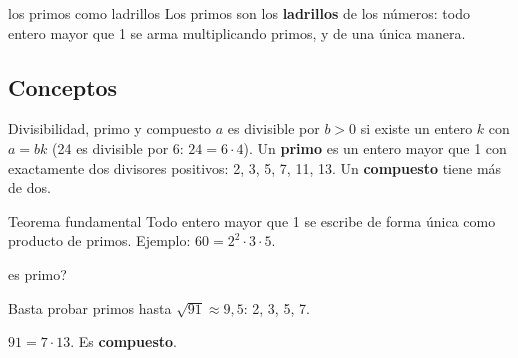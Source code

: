 \begin{tmconcepto}{los primos como ladrillos}
Los primos son los \textbf{ladrillos} de los n\'umeros: todo entero mayor que 1 se arma multiplicando primos, y de una \'unica manera.
\end{tmconcepto}


\subsection{Conceptos}
\begin{tmdef}{Divisibilidad, primo y compuesto}
$a$ es divisible por $b>0$ si existe un entero $k$ con $a=bk$ (24 es divisible por 6: $24=6\cdot4$). Un \textbf{primo} es un entero mayor que 1 con exactamente dos divisores positivos: 2, 3, 5, 7, 11, 13. Un \textbf{compuesto} tiene m\'as de dos.
\end{tmdef}

\begin{tmdef}{Teorema fundamental}
Todo entero mayor que 1 se escribe de forma \'unica como producto de primos. Ejemplo: $60=2^2\cdot3\cdot5$.
\end{tmdef}

\begin{center}
\end{center}

\begin{tmejemplo}{ es primo?}
\begin{tmpasos}
\item Basta probar primos hasta $\sqrt{91}\approx9{,}5$: 2, 3, 5, 7.
\item $91=7\cdot13$. Es \textbf{compuesto}.
\end{tmpasos}
\end{tmejemplo}

